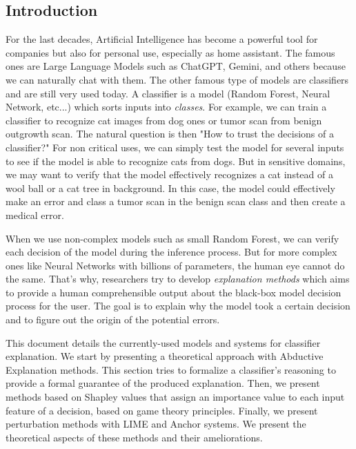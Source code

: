 
\subsection*{Introduction}

For the last decades, Artificial Intelligence has become a powerful tool 
for companies but also for personal use, especially as home assistant. 
The famous ones are Large Language Models such as ChatGPT, Gemini, and others 
because we can naturally chat with them.
The other famous type of models are classifiers and are still very used 
today. A classifier is a model (Random Forest, Neural Network, etc...) which 
sorts inputs into \emph{classes}. For example, we can train a classifier to 
recognize cat images from dog ones or tumor scan from benign outgrowth scan.
The natural question is then "How to trust the decisions of a classifier?"
For non critical uses, we can simply test the model for several inputs 
to see if the model is able to recognize cats from dogs. But in sensitive 
domains, we may want to verify that the model effectively recognizes a cat 
instead of a wool ball or a cat tree in background. In this case, the model 
could effectively make an error and class a tumor scan in the benign scan class and then 
create a medical error. 

When we use non-complex models such as small Random Forest, we can 
verify each decision of the model during the inference process. But for 
more complex ones like Neural Networks with billions of parameters, the human
eye cannot do the same. 
That's why, researchers try to develop \emph{explanation methods} which aims 
to provide a human comprehensible output about the black-box model decision process 
for the user. The goal is to explain why the model took a certain decision 
and to figure out the origin of the potential errors. 

This document details the currently-used models and systems for classifier 
explanation.
We start by presenting a theoretical approach with Abductive Explanation methods. This section tries to formalize a classifier's reasoning to provide a formal  guarantee of the produced explanation. Then, we present methods based on Shapley values that assign an importance value to each input feature of a decision, based on game theory principles. Finally, we present perturbation methods with LIME and Anchor systems. We present the theoretical aspects of these methods and
their ameliorations.

